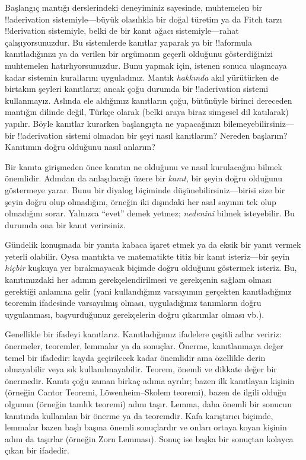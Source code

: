 \documentclass[../../../include/open-logic-section]{subfiles}
\begin{document}


Başlangıç mantığı derslerindeki deneyiminiz sayesinde, muhtemelen bir
!!a{derivation} sistemiyle---büyük olasılıkla bir doğal türetim ya da
Fitch tarzı !!{derivation} sistemiyle, belki de bir kanıt ağacı
sistemiyle---rahat çalışıyorsunuzdur. Bu sistemlerde kanıtlar yaparak ya
bir !!a{formula} kanıtladığınızı ya da verilen bir argümanın geçerli
olduğunu gösterdiğinizi muhtemelen hatırlıyorsunuzdur. Bunu yapmak için,
istenen sonuca ulaşıncaya kadar sistemin kurallarını uyguladınız. Mantık
\emph{hakkında} akıl yürütürken de birtakım şeyleri kanıtlarız; ancak
çoğu durumda bir !!a{derivation} sistemi kullanmayız. Aslında ele
aldığımız kanıtların çoğu, bütünüyle birinci dereceden mantığın dilinde
değil, Türkçe olarak (belki araya biraz simgesel dil katılarak)
yapılır. Böyle kanıtlar kurarken başlangıçta ne yapacağınızı
bilemeyebilirsiniz---bir !!a{derivation} sistemi olmadan bir şeyi nasıl
kanıtlarım? Nereden başlarım? Kanıtımın doğru olduğunu nasıl anlarım?

Bir kanıta girişmeden önce kanıtın ne olduğunu ve nasıl kurulacağını
bilmek önemlidir. Adından da anlaşılacağı üzere bir \emph{kanıt}, bir
şeyin doğru olduğunu göstermeye yarar. Bunu bir diyalog biçiminde
düşünebilirsiniz---birisi size bir şeyin doğru olup olmadığını, örneğin
iki dışındaki her asal sayının tek olup olmadığını sorar. Yalnızca
``evet'' demek yetmez; \emph{nedenini} bilmek isteyebilir. Bu durumda ona
bir kanıt verirsiniz.

Gündelik konuşmada bir yanıta kabaca işaret etmek ya da eksik bir yanıt
vermek yeterli olabilir. Oysa mantıkta ve matematikte titiz bir kanıt
isteriz---bir şeyin \emph{hiçbir} kuşkuya yer bırakmayacak biçimde doğru
olduğunu göstermek isteriz. Bu, kanıtımızdaki her adımın
gerekçelendirilmesi ve gerekçenin sağlam olması gerektiği anlamına gelir
(yani kullandığınız varsayımın gerçekten kanıtladığınız teoremin
ifadesinde varsayılmış olması, uyguladığınız tanımların doğru
uygulanması, başvurduğunuz gerekçelerin doğru çıkarımlar olması vb.).

Genellikle bir ifadeyi kanıtlarız. Kanıtladığımız ifadelere çeşitli
adlar veririz: önermeler, teoremler, lemmalar ya da sonuçlar. Önerme,
kanıtlanmaya değer temel bir ifadedir: kayda geçirilecek kadar önemlidir
ama özellikle derin olmayabilir veya sık kullanılmayabilir. Teorem,
önemli ve dikkate değer bir önermedir. Kanıtı çoğu zaman birkaç adıma
ayrılır; bazen ilk kanıtlayan kişinin (örneğin Cantor Teoremi,
L\"owenheim--Skolem teoremi), bazen de ilgili olduğu olgunun (örneğin
tamlık teoremi) adını taşır. Lemma, daha önemli bir sonucun kanıtında
kullanılan bir önerme ya da teoremdir. Kafa karıştırıcı biçimde,
lemmalar bazen başlı başına önemli sonuçlardır ve onları ortaya koyan
kişinin adını da taşırlar (örneğin Zorn Lemması). Sonuç ise başka bir
sonuçtan kolayca çıkan bir ifadedir.
\end{document}
